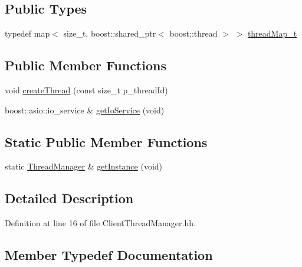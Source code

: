 \subsection*{Public Types}
\begin{DoxyCompactItemize}
\item 
typedef map$<$ size\+\_\+t, boost\+::shared\+\_\+ptr$<$ boost\+::thread $>$ $>$ \hyperlink{classxtd_1_1network_1_1base_1_1ThreadManager_a589ebd86682829a8dc09475c24d303c7}{thread\+Map\+\_\+t}
\end{DoxyCompactItemize}
\subsection*{Public Member Functions}
\begin{DoxyCompactItemize}
\item 
void \hyperlink{classxtd_1_1network_1_1base_1_1ThreadManager_a8401b77963df643d6ca29e5abd7da9ba}{create\+Thread} (const size\+\_\+t p\+\_\+thread\+Id)
\item 
boost\+::asio\+::io\+\_\+service \& \hyperlink{classxtd_1_1network_1_1base_1_1ThreadManager_afe3f6bc402d13a07cad5fc8d09473739}{get\+Io\+Service} (void)
\end{DoxyCompactItemize}
\subsection*{Static Public Member Functions}
\begin{DoxyCompactItemize}
\item 
static \hyperlink{classxtd_1_1network_1_1base_1_1ThreadManager}{Thread\+Manager} \& \hyperlink{classxtd_1_1network_1_1base_1_1ThreadManager_a987b37b09ba82f07f870f4720561c958}{get\+Instance} (void)
\end{DoxyCompactItemize}


\subsection{Detailed Description}


Definition at line 16 of file Client\+Thread\+Manager.\+hh.



\subsection{Member Typedef Documentation}
